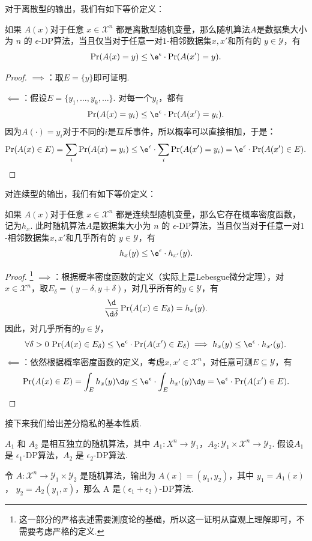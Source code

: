 对于离散型的输出，我们有如下等价定义：
\begin{proposition}\label{prop:discrete-dp}
    如果 $A(x)$对于任意 $x \in \mathcal X^n$ 都是离散型随机变量，那么随机算法$A$是数据集大小为 $n$ 的 $\epsilon$-DP算法，当且仅当对于任意一对$1$-相邻数据集$x, x'$和所有的 $y \in \mathcal Y$，有
    \[
    \Pr(A(x) = y) \leq \e^{\epsilon} \cdot \Pr(A(x') = y).
    \]
\end{proposition}
\begin{proof}
$\implies$：取$E = \{y\}$即可证明.

$\impliedby$：假设$E=\{y_1,\dots,y_k,\dots\}$. 对每一个$y_i$，都有
    \[
    \Pr(A(x) = y_i) \leq \e^{\epsilon} \cdot \Pr(A(x') = y_i).
    \]
因为$A(\cdot)=y_i$对于不同的$i$是互斥事件，所以概率可以直接相加，于是：
    \[
    \Pr(A(x) \in E) = \sum_i \Pr(A(x) = y_i) \leq \e^{\epsilon} \cdot \sum_i\Pr(A(x') = y_i) = \e^{\epsilon} \cdot \Pr(A(x') \in E).
    \]
\end{proof}

对连续型的输出，我们有如下等价定义：
\begin{proposition}\label{prop:continuous-dp}
如果 $A(x)$对于任意 $x \in \mathcal X^n$ 都是连续型随机变量，那么它存在概率密度函数，记为$h_{x}$. 此时随机算法$A$是数据集大小为 $n$ 的 $\epsilon$-DP算法，当且仅当对于任意一对$1$-相邻数据集$x, x'$和几乎所有的 $y \in \mathcal Y$，有
    \[
    h_{x}(y) \leq \e^{\epsilon} \cdot h_{x'}(y).
    \]
\end{proposition}
\begin{proof}\footnote{这一部分的严格表述需要测度论的基础，所以这一证明从直观上理解即可，不需要考虑严格的定义. }
$\implies$：根据概率密度函数的定义（实际上是Lebesgue微分定理），对$x\in\mathcal X^n$，取$E_\delta = (y-\delta, y+\delta)$，对几乎所有的$y\in\mathcal Y$，有
\[\frac{\d}{\d\delta}\Pr(A(x)\in E_\delta)=h_x(y).\]
因此，对几乎所有的$y\in\mathcal Y$，
\[\forall\delta>0\,\Pr(A(x)\in E_\delta) \leq \e^{\epsilon} \cdot \Pr(A(x')\in E_\delta)\implies h_x(y)\leq \e^\epsilon\cdot h_{x'}(y).\]
$\impliedby$：依然根据概率密度函数的定义，考虑$x,x'\in\mathcal X^n$，对任意可测$E\subseteq\mathcal Y$，有
\[\Pr(A(x)\in E)=\int_E h_x(y)\d y\leq \e^\epsilon\cdot\int_E h_{x'}(y)\d y=\e^\epsilon\cdot\Pr(A(x')\in E).\]
\end{proof}

接下来我们给出差分隐私的基本性质. 

\begin{proposition}\label{prop:composition}
    $A_1$ 和 $A_2$ 是相互独立的随机算法，其中 $A_1 : X^n \to \mathcal Y_1$，$A_2 : \mathcal Y_1 \times \mathcal X^n \to \mathcal Y_2$. 假设$A_1$是 $\epsilon_1$-DP算法，$A_2$ 是 $\epsilon_2$-DP算法.
    
    令 $A :\mathcal X^n \to \mathcal Y_1 \times \mathcal Y_2$ 是随机算法，输出为 $A(x) = (y_1, y_2)$，其中 $y_1 = A_1(x)$， $y_2 = A_2(y_1, x)$，那么 A 是$(\epsilon_1 + \epsilon_2)$-DP算法.
\end{proposition}

